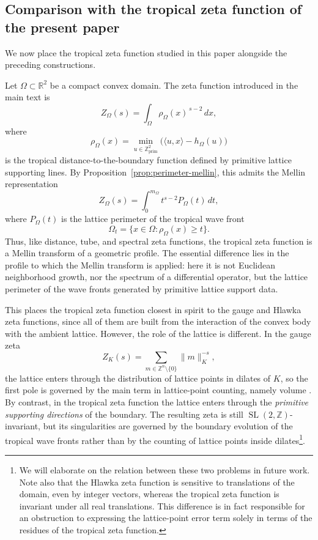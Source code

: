 \documentclass[a4paper,american,11pt]{amsart}
\theoremstyle{plain}
\theoremstyle{definition}
\newcommand{\Z}{\mathbb Z}
\newcommand{\R}{\mathbb R}
\let\ZZ\Z
\let\RR\R
\begin{document}
\subsection{Comparison with the tropical zeta function of the present paper}

We now place the tropical zeta function studied in this paper alongside the preceding constructions.

Let \(\Omega\subset\RR^2\) be a compact convex domain. The zeta function introduced in the main text is
\[
Z_\Omega(s)=\int_\Omega \rho_\Omega(x)^{\,s-2}\,dx,
\]
where
\[
\rho_\Omega(x)=\min_{u\in\ZZ^2_{\mathrm{prim}}}\bigl(\langle u,x\rangle-h_\Omega(u)\bigr)
\]
is the tropical distance-to-the-boundary function defined by primitive lattice supporting lines. By Proposition~\ref{prop:perimeter-mellin}, this admits the Mellin representation
\[
Z_\Omega(s)=\int_0^{m_\Omega} t^{s-2}P_\Omega(t)\,dt,
\]
where \(P_\Omega(t)\) is the lattice perimeter of the tropical wave front
\[
\Omega_t=\{x\in\Omega:\rho_\Omega(x)\ge t\}.
\]
Thus, like distance, tube, and spectral zeta functions, the tropical zeta function is a Mellin transform of a geometric profile. The essential difference lies in the profile to which the Mellin transform is applied: here it is not Euclidean neighborhood growth, nor the spectrum of a differential operator, but the lattice perimeter of the wave fronts generated by primitive lattice support data.

This places the tropical zeta function closest in spirit to the gauge and Hlawka zeta functions, since all of them are built from the interaction of the convex body with the ambient lattice. However, the role of the lattice is different. In the gauge zeta
\[
Z_K(s)=\sum_{m\in\ZZ^n\setminus\{0\}}\|m\|_K^{-s},
\]
the lattice enters through the distribution of lattice points in dilates of \(K\), so the first pole is governed by the main term in lattice-point counting, namely volume \cite{KratzelNowak1991,Montoro2018}. By contrast, in the tropical zeta function the lattice enters through the \emph{primitive supporting directions} of the boundary. The resulting zeta is still \(\operatorname{SL}(2,\ZZ)\)-invariant, but its singularities are governed by the boundary evolution of the tropical wave fronts rather than by the counting of lattice points inside dilates\footnote{We will elaborate on the relation between these two problems in future work. Note also that the Hlawka zeta function is sensitive to translations of the domain, even by integer vectors, whereas the tropical zeta function is invariant under all real translations. This difference is in fact responsible for an obstruction to expressing the lattice-point error term solely in terms of the residues of the tropical zeta function.}.
\end{document}
